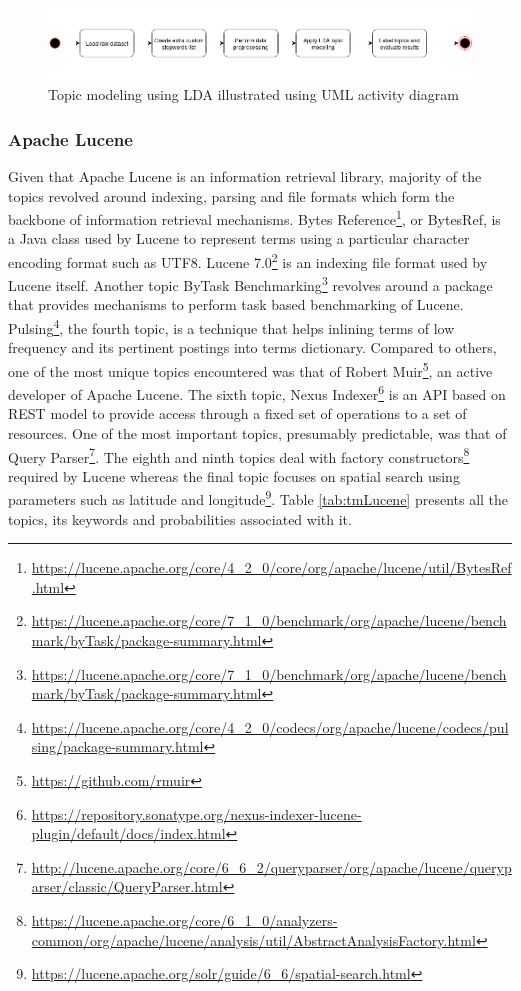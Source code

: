 \documentclass[a4paper,12pt,twoside]{report}
\begin{document}
\begin{figure}[h] %
    \centering
    \includegraphics[width=14cm]{topic-modeling}
    \caption{Topic modeling using LDA illustrated using UML activity diagram}
    \label{fig:topicmodelClass}
\end{figure}

\subsubsection{Apache Lucene} 
Given that Apache Lucene is an information retrieval library, majority of the topics revolved around indexing, parsing and file formats which form the backbone of information retrieval mechanisms. Bytes Reference\footnote{\url{https://lucene.apache.org/core/4_2_0/core/org/apache/lucene/util/BytesRef.html}}, or BytesRef, is a Java class used by Lucene to represent terms using a particular character encoding format such as UTF8. Lucene 7.0\footnote{\url{https://lucene.apache.org/core/7_1_0/benchmark/org/apache/lucene/benchmark/byTask/package-summary.html}} is an indexing file format used by Lucene itself. Another topic ByTask Benchmarking\footnote{\url{https://lucene.apache.org/core/7_1_0/benchmark/org/apache/lucene/benchmark/byTask/package-summary.html}} revolves around a package that provides mechanisms to perform task based benchmarking of Lucene. Pulsing\footnote{\url{https://lucene.apache.org/core/4_2_0/codecs/org/apache/lucene/codecs/pulsing/package-summary.html}}, the fourth topic, is a technique that helps inlining terms of low frequency and its pertinent postings into terms dictionary. Compared to others, one of the most unique topics encountered was that of Robert Muir\footnote{\url{https://github.com/rmuir}}, an active developer of Apache Lucene. The sixth topic, Nexus Indexer\footnote{\url{https://repository.sonatype.org/nexus-indexer-lucene-plugin/default/docs/index.html}} is an API based on REST model to provide access through a fixed set of operations to a set of resources. One of the most important topics, presumably predictable, was that of Query Parser\footnote{\url{http://lucene.apache.org/core/6_6_2/queryparser/org/apache/lucene/queryparser/classic/QueryParser.html}}. The eighth and ninth topics deal with factory constructors\footnote{\url{https://lucene.apache.org/core/6_1_0/analyzers-common/org/apache/lucene/analysis/util/AbstractAnalysisFactory.html}} required by Lucene whereas the final topic focuses on spatial search using parameters such as latitude and longitude\footnote{\url{https://lucene.apache.org/solr/guide/6_6/spatial-search.html}}. Table \ref{tab:tmLucene} presents all the topics, its keywords and probabilities associated with it. 
\end{document}
